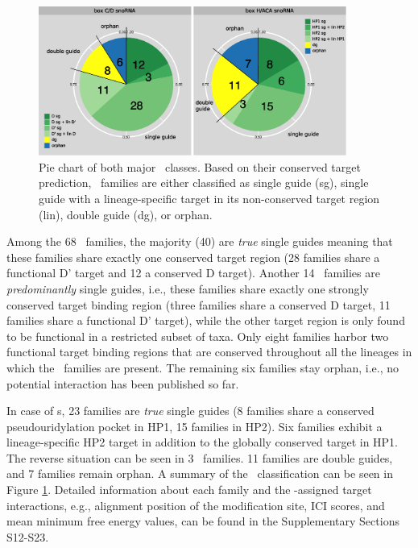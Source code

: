 \begin{figure}
  \centering
  \includegraphics[width=0.9\textwidth]{pics/pieCharts_snoRNAs_modified.eps}
  \caption[Classification of \sno\ families as single or double
  guides.]{Pie chart of both major \sno\ classes. Based on their conserved
    target prediction, \sno\ families are either classified as single guide
    (sg), single guide with a lineage-specific target in its non-conserved
    target region (lin), double guide (dg), or orphan.}
  \label{fig:pie_charts}
\end{figure}

Among the 68 \cd\ families, the majority (40) are \textit{true} single
guides meaning that these families share exactly one conserved target
region (28 families share a functional D' target and 12 a conserved D
target). Another 14 \cd\ families are \textit{predominantly} single guides,
i.e., these families share exactly one strongly conserved target binding
region (three families share a conserved D target, 11 families share a
functional D' target), while the other target region is only found to be
functional in a restricted subset of taxa. Only eight families harbor two
functional target binding regions that are conserved throughout all the
lineages in which the \sno\ families are present. The remaining six
families stay orphan, i.e., no potential interaction has been published so
far.

In case of {\haca}s, 23 families are \textit{true} single guides (8
families share a conserved pseudouridylation pocket in HP1, 15 families in
HP2). Six families exhibit a lineage-specific HP2 target in addition to the
globally conserved target in HP1. The reverse situation can be seen in 3
\haca\ families. 11 families are double guides, and 7 families remain
orphan. A summary of the \sno\ classification can be seen in Figure
\ref{fig:pie_charts}.  Detailed information about each family and the
\snostrip-assigned target interactions, e.g., alignment position of the
modification site, ICI scores, and mean minimum free energy values, can be
found in the Supplementary Sections S12-S23.

